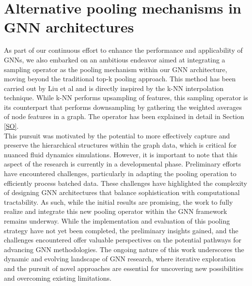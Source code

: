 \section{Alternative pooling mechanisms in GNN architectures}
As part of our continuous effort to enhance the performance and applicability of GNNs, we also embarked on an ambitious endeavor aimed at integrating a sampling operator as the pooling mechanism within our GNN architecture, moving beyond the traditional top-k pooling approach. This method has been carried out by Liu et al \cite{metalearning} and is directly inspired by the k-NN interpolation technique. While k-NN performs upsampling of features, this sampling operator is its counterpart that performs downsampling by gathering the weighted averages of node features in a graph. The operator has been explained in detail in Section \ref{SO}. \\
This pursuit was motivated by the potential to more effectively capture and preserve the hierarchical structures within the graph data, which is critical for nuanced fluid dynamics simulations.  However, it is important to note that this aspect of the research is currently in a developmental phase. Preliminary efforts have encountered challenges, particularly in adapting the pooling operation to efficiently process batched data. These challenges have highlighted the complexity of designing GNN architectures that balance sophistication with computational tractability. As such, while the initial results are promising, the work to fully realize and integrate this new pooling operator within the GNN framework remains underway. While the implementation and evaluation of this pooling strategy have not yet been completed, the preliminary insights gained, and the challenges encountered offer valuable perspectives on the potential pathways for advancing GNN methodologies. The ongoing nature of this work underscores the dynamic and evolving landscape of GNN research, where iterative exploration and the pursuit of novel approaches are essential for uncovering new possibilities and overcoming existing limitations.
